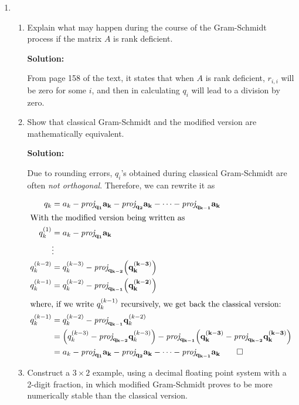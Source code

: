 \documentclass[12pt]{article}
\newcommand{\proj}[2][]{\textit{proj}_{\vect{#1}}\vect{#2}}
\newcommand{\vect}{\mathbf}
\begin{document}
\begin{enumerate}
\begin{enumerate}
\end{enumerate}

\item \
\begin{enumerate}
  \item Explain what may happen during the course of the Gram-Schmidt process if
  the matrix $A$ is rank deficient.

  {\bf Solution:}

  From page 158 of the text, it states that when $A$ is rank deficient, $r_{i,i}$
  will be zero for some $i$, and then in calculating $q_{i}$ will lead to a division
  by zero.

  \item Show that classical Gram-Schmidt and the modified version are mathematically
  equivalent.

  {\bf Solution:}

  Due to rounding errors, $q_{i}$'s obtained during classical Gram-Schmidt are
  often {\em not orthogonal}. Therefore, we can rewrite it as

  \begin{align*}
    q_{k} &= a_{k} - \proj[q_{1}]{a_{k}} - \proj[q_{2}]{a_{k}} - \cdots - \proj[q_{k-1}]{a_{k}}\\
    \intertext{With the modified version being written as}
    q_{k}^{(1)} &= a_{k} - \proj[q_{1}]{a_{k}}\\
                &\vdots\\
    q_{k}^{(k-2)} &= q_{k}^{(k-3)} - \proj[q_{k-2}]{\left(q_{k}^{(k-3)}\right)}\\
    q_{k}^{(k-1)} &= q_{k}^{(k-2)} - \proj[q_{k-1}]{\left(q_{k}^{(k-2)}\right)}\\
    \intertext{where, if we write $q_{k}^{(k-1)}$ recursively, we get back the classical version:}
    q_{k}^{(k-1)} &= q_{k}^{(k-2)} - \proj[q_{k-1}]q_{k}^{(k-2)}\\
                  &= \left(q_{k}^{(k-3)} - \proj[q_{k-2}]q_{k}^{(k-3)}\right) - \proj[q_{k-1}]{\left( q_{k}^{(k-3)} - \proj[q_{k-2}]{q_{k}^{(k-3)}} \right)}  \\
                  &= a_{k} - \proj[q_{1}]{a_{k}} - \proj[q_{2}]{a_{k}} - \cdots - \proj[q_{k-1}]{a_{k}} \qed
  \end{align*}

  \item Construct a $3\times 2$ example, using a decimal floating point system
  with a 2-digit fraction, in which modified Gram-Schmidt proves to be more
  numerically stable than the classical version.


\end{enumerate}
\end{enumerate}
\end{document}
